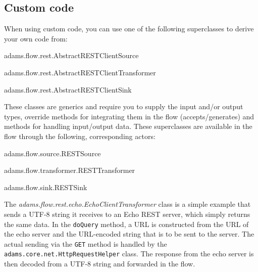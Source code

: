 \documentclass[a4paper]{book}
\begin{document}
\subsection{Custom code}
When using custom code, you can use one of the following superclasses to derive
your own code from:
\begin{tight_itemize}
  \item adams.flow.rest.AbstractRESTClientSource
  \item adams.flow.rest.AbstractRESTClientTransformer
  \item adams.flow.rest.AbstractRESTClientSink
\end{tight_itemize}
These classes are generics and require you to supply the input and/or output
types, override methods for integrating them in the flow (accepts/generates)
and methods for handling input/output data.
These superclasses are available in the flow through the following, corresponding
actors:
\begin{tight_itemize}
  \item adams.flow.source.RESTSource
  \item adams.flow.transformer.RESTTransformer
  \item adams.flow.sink.RESTSink
\end{tight_itemize}

The \textit{adams.flow.rest.echo.EchoClientTransformer} class is a simple
example that sends a UTF-8 string it receives to an Echo REST server, which simply
returns the same data. In the \verb|doQuery| method, a URL is constructed
from the URL of the echo server and the URL-encoded string that is to be sent
to the server. The actual sending via the \verb|GET| method is handled by the
\verb|adams.core.net.HttpRequestHelper| class. The response from the echo
server is then decoded from a UTF-8 string and forwarded in the flow.
\end{document}
